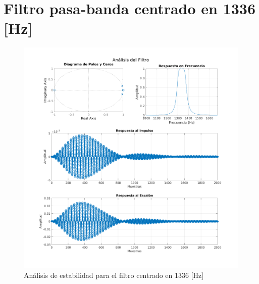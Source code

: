 \section{Filtro pasa-banda centrado en 1336 [Hz]}
\begin{figure}[H]
  \centering
  \includegraphics[width=\linewidth]{images/simulacion/1336.png}
  \caption{Análisis de estabilidad para el filtro centrado en 1336 [Hz]}
  \label{fig:analisis_1336}
\end{figure}

